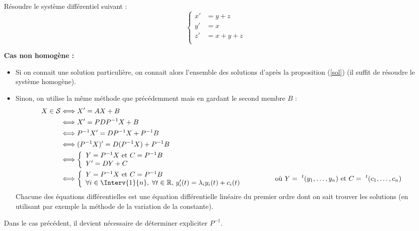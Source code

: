 \documentclass[a4paper,10pt]{report}
\begin{document}
\begin{ApplicationDirecte} Résoudre le système différentiel suivant :
$$ \left\lbrace \begin{array}{lll}
     x'&=y+z \\
    y' & =x \\
     z'&=x+y+z \\
    \end{array}\right.$$

\end{ApplicationDirecte}
\medskip

\textbf{Cas non homogène :} 
\begin{itemize}
\item Si on connait une solution particulière, on connait alors l'ensemble des solutions d'après la proposition (\ref{sol}) (il suffit de résoudre le système homogène).
\item Sinon, on utilise la même méthode que précédemment mais en gardant le second membre $B$ :
\begin{align*}
X \in \mathcal{S} & \Longleftrightarrow  X'=AX+B \\
& \Longleftrightarrow X'=PDP^{-1} X+B\\
& \Longleftrightarrow P^{-1}X'=DP^{-1}X + P^{-1}B\\
& \Longleftrightarrow (P^{-1}X)'=D(P^{-1}X) + P^{-1}B \\
& \Longleftrightarrow \left\lbrace \begin{array}{l}
Y=P^{-1}X \hbox{ et }  C=P^{-1}B\\
Y'=DY+C \\
\end{array}\right. \\
& \Longleftrightarrow \left\lbrace \begin{array}{l}
Y=P^{-1}X \hbox{ et }  C=P^{-1}B\\
\forall i \in \Interv{1}{n}, \; \forall t \in  \mathbb{R}, \, y_i'(t)=\lambda_i y_i(t) + c_i(t)  \\
\end{array}\right. \qquad \qquad \hbox{ où } Y= ~^t(y_1, \ldots, y_n) \hbox{ et } C= ~^t(c_1, \ldots, c_n)
\end{align*}
Chacune des équations différentielles est une équation différentielle linéaire du premier ordre dont on sait trouver les solutions (en utilisant par exemple la méthode de la variation de la constante).
\end{itemize}

\begin{Remarque}{} Dans le cas précédent, il devient nécessaire de déterminer expliciter $P^{-1}$.
\end{Remarque}
\medskip
\end{document}
